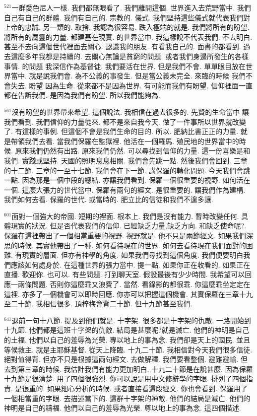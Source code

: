 \documentclass{book}
\begin{document}
$^{521}$一群愛色尼人一樣.
我們都無眼看了.
我們離開這個.
世界進入去荒野當中.
我們自己有自己的群體.
我們有自己的.
宗教的.
儀式.
我們堅持這些儀式就代表我們對上帝的忠誠.
另一類的.
取捨.
我認為很容易.
跌入極端的就是.
我們將所有的盼望.
將所有的屬靈的力量.
都建基在現實.
的世界當中.
我這樣說不代表我們.
不去明白.
甚至不去向這個世代裡面去關心.
認識我的朋友.
有看我自己的.
面書的都看到.
過去這麼多年我都是持續的.
去關心無論是貧窮的問題.
或者我們身邊所發生的各樣事情.
的問題 我深信作為基督徒.
我們要活在世界.
但是我們不會.
單單眼目放在世界當中.
就是說我們會.
為不公義的事發生.
但是當公義未完全.
來臨的時候 我們不會失去.
盼望 因為生命.
從來都不是因為世界.
有可能而我們有盼望.
信仰裡面一直都在告訴我們.
是因為我們有盼望.
所以我們能夠為.

$^{561}$沒有盼望的世界帶來希望.
這個說法.
我相信在過去很多的.
先賢的生命當中 讓我們看到.
我們信仰的力量從來.
都不是來自我今天.
做了一件事所以世界就改變了.
有這樣的事例.
但這個不會是我們生命的目的.
所以.
肥納比書正正的力量.
就是帶領我們去看.
當我們保羅在監獄裡.
他活在一個羅馬.
殖民地的世界當中的時候.
原來我們仍然有出路.
原來我們仍然.
可以尋找到信仰的力量.
這一份喜樂是和我們.
實踐或堅持.
天國的照明息息相關.
我們會先跳一點.
然後我們會回到.
三章的十二節.
三章的一至十七節.
我們會在下一節.
講保羅的轉化問題.
今天我們會跳一點.
因為那是一個中段的總結.
亦讓我們看到.
保羅一個很重要的視野.
如何活在一個.
這麼大張力的世代當中.
保羅有兩句的經文.
是很重要的.
讓我們作為建構.
我們如何去看.
保羅的世代.
或當時的.
肥立比的信徒和我們不遑多讓.

$^{601}$面對一個強大的帝國.
短期的裡面.
根本上.
我們是沒有能力.
暫時改變任何.
具體現實的狀況.
但是否代表我們的信仰.
已經缺乏力量,缺乏方向.
和缺乏使命呢?.
保羅在這裡帶出了一個相當重要的視野.
視野就是.
他不只是兩節經文.
如果我們深思的時候.
其實他帶出了一種.
如何看待現在的世界.
如何去看待現在我們面對的困難.
有現實的層面.
但亦有神學的角度.
如果我們尋找到這個角度.
我們便要明白我們應該如何處身於.
在這種世界的張力當中.
提一點.
如果你正在收看的.
如果正在直播.
歡迎你.
也可以.
有些問題.
打到聊天室.
假設最後有少少時間.
我希望可以回應一兩條問題.
否則你這麼乖又浪費了.
當然.
看錄影的都很乖.
你這麼乖坐定定在這裡.
亦多了一個機會可以即時回應.
你亦可以把握這個機會.
其實保羅在三章十九至二十節.
我相信很多.
頂梓梅會背二十節.
但十九節甚至我們.

$^{641}$退前一句十八節.
提及到他們就是.
十字架.
很多都是十字架的仇敵.
一路開始到十九節.
他們都是這班十字架的仇敵.
結局是甚麼呢?就是滅亡.
他們的神明是自己的土福.
他們以自己的羞辱為光榮.
專以地上的事為念.
我們卻是天上的國民.
並且等候救主.
就是主耶穌基督.
從天上降臨.
十九二十節.
我相信對今天我們很多信徒.
絕對值得背.
但亦不只是根據這兩句經文.
去做解釋.
我們要看整個.
避難避輸.
但去到第三章的時候.
我估計我們有能力更加明白.
十九二十節是在說甚麼.
因為保羅十九節是很清楚.
用了四個很強烈.
你可以說是用中文修辭學的字眼.
排列了四個指責.
是很重的.
如果細心分析的時候.
或者直接看這段經文.
你也會看到.
保羅用了一個相當重的字眼.
去描述當下的.
這群十字架的神敵.
他們的結局是滅亡.
他們的神明是自己的禱福.
他們以自己的羞辱為光榮.
尊以地上的事為念.
這四個描述.
\end{document}

